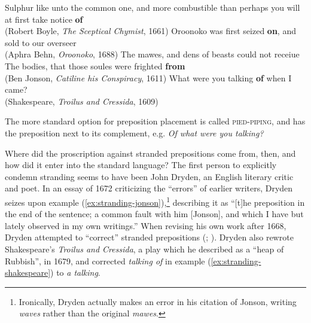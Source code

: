 \begin{exe}
\ex Sulphur like unto the common one, and more combustible than perhaps you will at first take notice \textbf{of}\\
(Robert Boyle, \textit{The Sceptical Chymist}, 1661)
\ex Oroonoko was first seized \textbf{on}, and sold to our overseer\\
(Aphra Behn, \textit{Oroonoko}, 1688)
\ex The mawes, and dens of beasts could not receiue\\
The bodies, that those soules were frighted \textbf{from}\\
(Ben Jonson, \textit{Catiline his Conspiracy}, 1611)\label{ex:stranding-jonson}
\ex What were you talking \textbf{of} when I came?\\
(Shakespeare, \textit{Troilus and Cressida}, 1609)\label{ex:stranding-shakespeare}
\end{exe}

\noindent The more standard option for preposition placement is called \textsc{pied-piping}, and has the preposition next to its complement, e.g. \textit{Of what were you talking?}

Where did the proscription against stranded prepositions come from, then, and how did it enter into the standard language? The first person to explicitly condemn stranding seems to have been John Dryden, an English literary critic and poet. In an essay of 1672 criticizing the ``errors'' of earlier writers, Dryden seizes upon example (\ref{ex:stranding-jonson}),\footnote{Ironically, Dryden actually makes an error in his citation of Jonson, writing \textit{waves} rather than the original \textit{mawes}.} describing it as ``[t]he preposition in the end of the sentence; a common fault with him [Jonson], and which I have but lately observed in my own writings.'' When revising his own work after 1668, Dryden attempted to ``correct'' stranded prepositions (\citealp{Bately1964}; \citealp[157--158, 188--194]{YanezBouza2015}). Dryden also rewrote Shakespeare's \textit{Troilus and Cressida}, a play which he described as a ``heap of Rubbish'', in 1679, and corrected \textit{talking of} in example (\ref{ex:stranding-shakespeare}) to \textit{a talking}.

